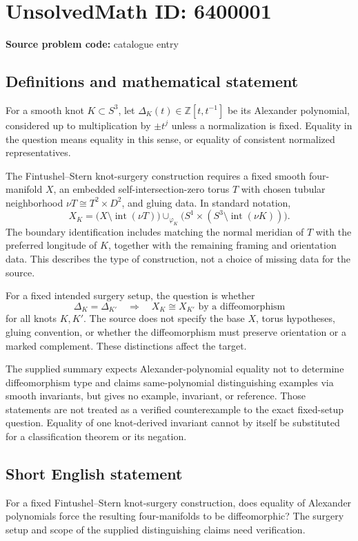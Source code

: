 \documentclass[11pt]{article}
\newcommand{\Z}{\mathbb{Z}}
\begin{document}
\section*{UnsolvedMath ID: 6400001}
\textbf{Source problem code:} catalogue entry
\subsection{Definitions and mathematical statement}
For a smooth knot $K\subset S^3$, let $\Delta_K(t)\in\Z[t,t^{-1}]$ be its Alexander polynomial, considered up to multiplication by $\pm t^j$ unless a normalization is fixed. Equality in the question means equality in this sense, or equality of consistent normalized representatives.

The Fintushel--Stern knot-surgery construction requires a fixed smooth four-manifold $X$, an embedded self-intersection-zero torus $T$ with chosen tubular neighborhood $\nu T\cong T^2\times D^2$, and gluing data. In standard notation,
\[
X_K=\bigl(X\setminus\operatorname{int}(\nu T)\bigr)
\mathop{\cup}_{\varphi_K}\bigl(S^1\times(S^3\setminus\operatorname{int}(\nu K))\bigr).
\]
The boundary identification includes matching the normal meridian of $T$ with the preferred longitude of $K$, together with the remaining framing and orientation data. This describes the type of construction, not a choice of missing data for the source.

For a fixed intended surgery setup, the question is whether
\[
\Delta_K=\Delta_{K'}\quad\Longrightarrow\quad X_K\cong X_{K'}\text{ by a diffeomorphism}
\]
for all knots $K,K'$. The source does not specify the base $X$, torus hypotheses, gluing convention, or whether the diffeomorphism must preserve orientation or a marked complement. These distinctions affect the target.

The supplied summary expects Alexander-polynomial equality not to determine diffeomorphism type and claims same-polynomial distinguishing examples via smooth invariants, but gives no example, invariant, or reference. Those statements are not treated as a verified counterexample to the exact fixed-setup question. Equality of one knot-derived invariant cannot by itself be substituted for a classification theorem or its negation.
\subsection{Short English statement}
For a fixed Fintushel--Stern knot-surgery construction, does equality of Alexander polynomials force the resulting four-manifolds to be diffeomorphic? The surgery setup and scope of the supplied distinguishing claims need verification.
\end{document}
